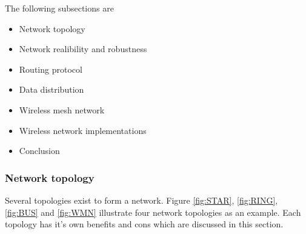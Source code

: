 \documentclass[10pt,a4paper]{article}
\begin{document}
The following subsections are 
\begin{itemize}
\setlength\itemsep{0em}
    \item Network topology
    \item Network realibility and robustness
    \item Routing protocol
    \item Data distribution
    \item Wireless mesh network
    \item Wireless network implementations
    \item Conclusion
\end{itemize}



\subsubsection{Network topology}
Several topologies exist to form a network. Figure \ref{fig:STAR}, \ref{fig:RING}, \ref{fig:BUS} and \ref{fig:WMN} illustrate four network topologies as an example. Each topology has it's own benefits and cons which are discussed in this section.
\end{document}
